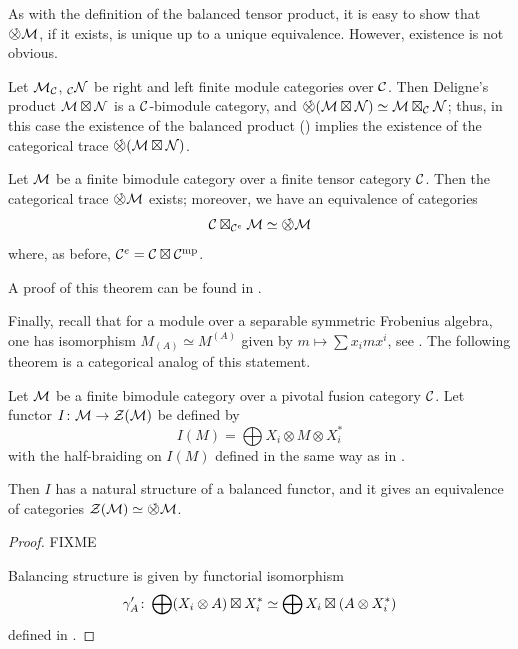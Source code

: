 As with the definition of the balanced tensor product, it is easy to show that
$\circtensor \calM$, if it exists, is unique up to a unique equivalence. However,
existence is not obvious.

\begin{example}\label{x:trace-deligne-product}
  Let $\mathcal{M}_{\mathcal{C}}$, ${}_{\mathcal{C}} \mathcal{N}$ be right and left finite module
  categories over $\mathcal{C}$. Then Deligne's product $\mathcal{M}\boxtimes \mathcal{N}$ is
  a $\mathcal{C}$-bimodule category, and $\circtensor (\calM\boxtimes \calN)\simeq
  \calM\boxtimes_\calC\calN$; thus, in this case the existence of the balanced product
  () implies the existence of the categorical trace
  $\circtensor (\calM\boxtimes\calN)$.
\end{example}
\begin{theorem}\label{t:cat-trace}
  Let $\mathcal{M}$ be a finite bimodule category over a finite tensor category
  $\mathcal{C}$. Then the categorical trace $\circtensor \calM$ exists;
  moreover, we have an equivalence of categories
  $$
    \calC\boxtimes_{\calC^e} \calM \simeq \circtensor \calM
  $$
  where, as before, $\mathcal{C}^e=\mathcal{C}\boxtimes\mathcal{C}^{\mathrm{mp}}$.
\end{theorem}
  A proof of this theorem can be found in
  \cite[Theorem 3.3]{fuchs-schaumann-schweigert-trace}.


Finally, recall that for a module over a separable symmetric Frobenius algebra,
one has isomorphism $M_{(A)}\simeq M^{(A)}$ given by $m\mapsto \sum x_imx^i$,
see . The following theorem is a categorical analog of
this statement.

\begin{theorem}\label{t:category-inv-coinv}
  Let $\mathcal{M}$ be a finite bimodule category over a pivotal fusion
  category  $\mathcal{C}$. Let functor $I\colon \mathcal{M}\to \mathcal{Z}(\mathcal{M})$ be defined by
  \begin{equation}
    I(M)= \bigoplus X_i\otimes M\otimes X_i^*
  \end{equation}
  with the half-braiding on $I(M)$ defined in the same way as in
  .

  Then $I$ has a natural structure of a balanced functor, and it
  gives an equivalence of categories $\calZ(\calM)\simeq \circtensor \calM$.
\end{theorem}
\begin{proof}
    FIXME

    Balancing structure is given by functorial isomorphism
    $$
    \gamma'_A\colon \bigoplus (X_i\otimes A) \boxtimes X_i^* \simeq
              \bigoplus X_i \boxtimes (A\otimes X_i^*)
    $$
    defined in .
\end{proof}